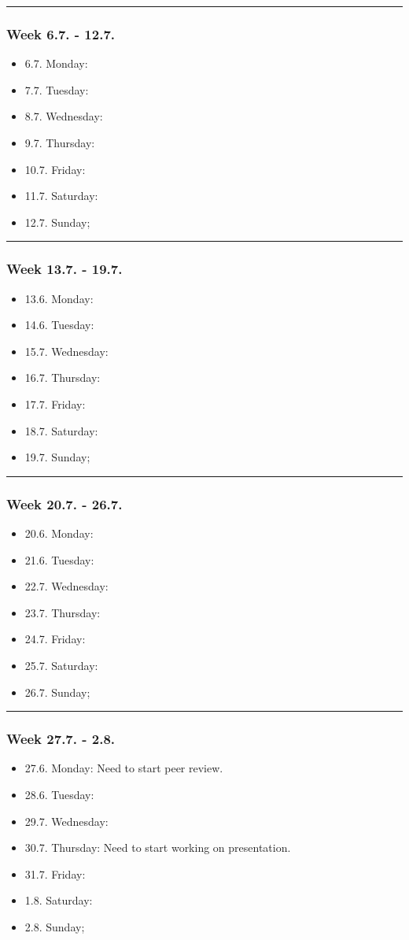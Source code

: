 \clearpage
\hrule
\subsubsection*{Week 6.7. - 12.7.}
\begin{itemize}
  \item  6.7. Monday:
  \item  7.7. Tuesday:
  \item  8.7. Wednesday:
  \item  9.7. Thursday:
  \item 10.7. Friday:
  \item 11.7. Saturday:
  \item 12.7. Sunday;
\end{itemize}

\hrule
\subsubsection*{Week 13.7. - 19.7.}
\begin{itemize}
  \item 13.6. Monday:
  \item 14.6. Tuesday:
  \item 15.7. Wednesday:
  \item 16.7. Thursday:
  \item 17.7. Friday:
  \item 18.7. Saturday:
  \item 19.7. Sunday;
\end{itemize}

\hrule
\subsubsection*{Week 20.7. - 26.7.}
\begin{itemize}
  \item 20.6. Monday:
  \item 21.6. Tuesday:
  \item 22.7. Wednesday:
  \item 23.7. Thursday:
  \item 24.7. Friday:
  \item 25.7. Saturday:
  \item 26.7. Sunday;
\end{itemize}

\clearpage
\hrule
\subsubsection*{Week 27.7. - 2.8.}
\begin{itemize}
  \item 27.6. Monday: Need to start peer review.
  \item 28.6. Tuesday:
  \item 29.7. Wednesday:
  \item 30.7. Thursday: Need to start working on presentation.
  \item 31.7. Friday:
  \item  1.8. Saturday:
  \item  2.8. Sunday;
\end{itemize}

